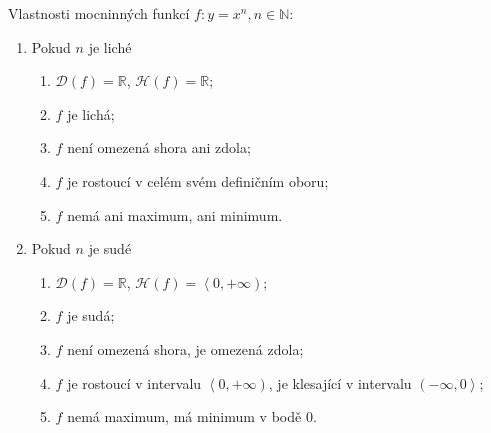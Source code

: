 \begin{veta}
  Vlastnosti mocninných funkcí $f\colon y= x^n, n \in \mathbb N$:
  \begin{enumerate}[1.]
    \item Pokud $n$ je liché
    \begin{enumerate}[$i.$]
      \item $\mathcal D(f)= \mathbb R$, $\mathcal H(f)= \mathbb R$;
      \item $f$ je lichá;
      \item $f$ není omezená shora ani zdola;
      \item $f$ je rostoucí v celém svém definičním oboru;
      \item $f$ nemá ani maximum, ani minimum.
    \end{enumerate}
    \item Pokud $n$ je sudé
    \begin{enumerate}[$i.$]
      \item $\mathcal D(f)= \mathbb R$, $\mathcal H(f)= \left<  0,+\infty \right)$;
      \item $f$ je sudá;
      \item $f$ není omezená shora, je omezená zdola;
      \item $f$ je rostoucí v intervalu $\left<  0,+\infty \right)$, je klesající v intervalu $\left( -\infty,0 \right> $;
      \item $f$ nemá maximum, má minimum v bodě $0$.
    \end{enumerate}
  \end{enumerate}
\end{veta}

